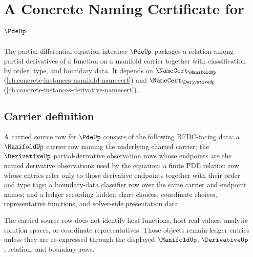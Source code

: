 \chapter{A Concrete Naming Certificate for $\PdeUp$}
\label{ch:concrete-instances-pde-namecert}

The partial-differential-equation interface $\PdeUp$ packages a relation among partial derivatives of a function on a manifold carrier together with classification by order, type, and boundary data. It depends on $\NameCert_{\ManifoldUp}$ (\autoref{ch:concrete-instances-manifold-namecert}) and $\NameCert_{\DerivativeUp}$ (\autoref{ch:concrete-instances-derivative-namecert}).

\section{Carrier definition}
\label{sec:pde-carrier}

\begin{definition}\label{def:pde-carried-source-row}
A carried source row for $\PdeUp$ consists of the following BEDC-facing data: a $\ManifoldUp$ carrier row naming the underlying charted carrier; the $\DerivativeUp$ partial-derivative observation rows whose endpoints are the named derivative observations used by the equation; a finite PDE relation row whose entries refer only to those derivative endpoints together with their order and type tags; a boundary-data classifier row over the same carrier and endpoint names; and a ledger recording hidden chart choices, coordinate choices, representative functions, and solver-side presentation data.

The carried source row does not identify host functions, host real values, analytic solution spaces, or coordinate representatives. Those objects remain ledger entries unless they are re-expressed through the displayed $\ManifoldUp$, $\DerivativeUp$, relation, and boundary rows.
\end{definition}

